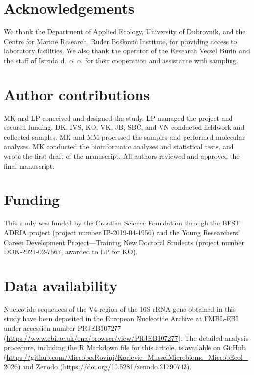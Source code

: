 \documentclass[
  12 pt,
]{article}
\begin{document}
\section{Acknowledgements}\label{acknowledgements}

We thank the Department of Applied Ecology, University of Dubrovnik, and the Centre for Marine Research, Ruđer Bošković Institute, for providing access to laboratory facilities. We also thank the operator of the Research Vessel Burin and the staff of Istrida d.~o. o. for their cooperation and assistance with sampling.

\section{Author contributions}\label{author-contributions}

MK and LP conceived and designed the study. LP managed the project and secured funding. DK, IVS, KO, VK, JB, SBČ, and VN conducted fieldwork and collected samples. MK and MM processed the samples and performed molecular analyses. MK conducted the bioinformatic analyses and statistical tests, and wrote the first draft of the manuscript. All authors reviewed and approved the final manuscript.

\section{Funding}\label{funding}

This study was funded by the Croatian Science Foundation through the BEST ADRIA project (project number IP-2019-04-1956) and the Young Researchers' Career Development Project---Training New Doctoral Students (project number DOK-2021-02-7567, awarded to LP for KO).

\section{Data availability}\label{data-availability}

Nucleotide sequences of the V4 region of the 16S rRNA gene obtained in this study have been deposited in the European Nucleotide Archive at EMBL-EBI under accession number PRJEB107277 (\url{https://www.ebi.ac.uk/ena/browser/view/PRJEB107277}). The detailed analysis procedure, including the R Markdown file for this article, is available on GitHub (\url{https://github.com/MicrobesRovinj/Korlevic_MusselMicrobiome_MicrobEcol_2026}) and Zenodo (\url{https://doi.org/10.5281/zenodo.21790743}).
\newpage
\end{document}
